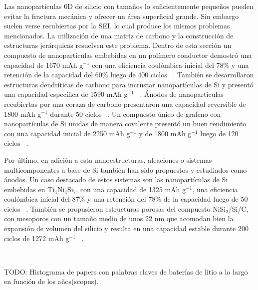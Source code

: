 Las nanopartículas 0D de silicio con tamaños lo suficientemente pequeños pueden 
evitar la fractura mecánica y ofrecer un área superficial grande. Sin embargo 
suelen verse recubiertas por la SEI, lo cual produce los mismos problemas 
mencionados. La utilización de una matriz de carbono y la construcción de 
estructuras jerárquicas resuelven este problema. Dentro de esta sección un
compuesto de nanopartículas embebidas en un polímero conductor demostró una 
capacidad de 1670 mAh g$^{-1}$ con una eficiencia coulómbica inicial del 78\% y 
una retención de la capacidad del 60\% luego de 400 ciclos ~\cite{chen2014}. 
También se desarrollaron estructuras dendríticas de carbono para incrustar 
nanopartículas de Si y presentó una capacidad específica de 1590 mAh g$^{-1}$ 
~\cite{magasinski2010}. Ánodos de nanopartículas recubiertas por una coraza de 
carbono presentaron una capacidad reversible de 1800 mAh g$^{-1}$ durante 50 
ciclos ~\cite{hwa2012}. Un compuesto único de grafeno con nanopartículas de Si 
unidas de manera covalente presentó un buen rendimiento con una capacidad inicial 
de 2250 mAh g$^{-1}$ y de 1800 mAh g$^{-1}$ luego de 120 ciclos ~\cite{wen2013}.

Por último, en adición a esta nanoestructuras, aleaciones o sistemas 
multicomponentes a base de Si también han sido propuestos y estudiados como 
ánodos. Un caso destacado de estos sistemas son las nanopartículas de Si 
embebidas en Ti$_4$Ni$_4$Si$_7$, con una capacidad de 1325 mAh g$^{-1}$, una 
eficiencia coulómbica inicial del 87\% y una retención del 78\% de la capacidad 
luego de 50 ciclos ~\cite{son2012}. También se propusieron estructuras porosas 
del compuesto NiSi$_2$/Si/C, con mesoporos con un tamaño medio de unos 22 nm que
acomodan bien la expansión de volumen del silicio y resulta en una capacidad 
estable durante 200 ciclos de 1272 mAh g$^{-1}$ ~\cite{jia2015}.

\

TODO: Histograma de papers con palabras claves de baterías de litio a lo largo en
función de los años(scopus).
